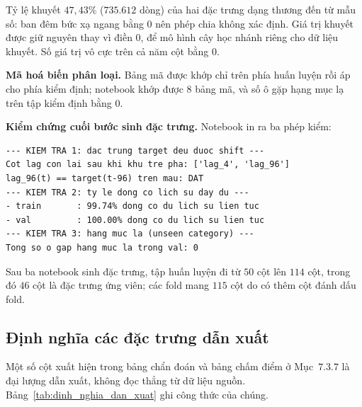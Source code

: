 \documentclass[12pt, a4paper]{report}
\begin{document}
Tỷ lệ khuyết $47{,}43\%$ ($735.612$ dòng) của hai đặc trưng dạng thương đến từ mẫu số: ban
đêm bức xạ ngang bằng $0$ nên phép chia không xác định. Giá trị khuyết được giữ nguyên thay
vì điền $0$, để mô hình cây học nhánh riêng cho dữ liệu khuyết. Số giá trị vô cực trên cả
năm cột bằng $0$.

\textbf{Mã hoá biến phân loại.} Bảng mã được khớp chỉ trên phía huấn luyện rồi áp
cho phía kiểm định; notebook khớp được $8$ bảng mã, và số ô gặp hạng mục lạ trên tập kiểm
định bằng $0$.

\textbf{Kiểm chứng cuối bước sinh đặc trưng.} Notebook in ra ba phép kiểm:

\begingroup
\par{}\vspace{8pt}
\small\renewcommand{\baselinestretch}{1.0}\selectfont
\begin{verbatim}
--- KIEM TRA 1: dac trung target deu duoc shift ---
Cot lag con lai sau khi khu tre pha: ['lag_4', 'lag_96']
lag_96(t) == target(t-96) tren mau: DAT
--- KIEM TRA 2: ty le dong co lich su day du ---
- train       : 99.74% dong co du lich su lien tuc
- val         : 100.00% dong co du lich su lien tuc
--- KIEM TRA 3: hang muc la (unseen category) ---
Tong so o gap hang muc la trong val: 0
\end{verbatim}
\par\vspace{8pt}
\endgroup
Sau ba notebook sinh đặc trưng, tập huấn luyện đi từ $50$ cột lên $114$ cột, trong đó $46$
cột là đặc trưng ứng viên; các fold mang $115$ cột do có thêm cột đánh dấu fold.

\FloatBarrier
\subsection{Định nghĩa các đặc trưng dẫn xuất}

Một số cột xuất hiện trong bảng chẩn đoán và bảng chấm điểm ở Mục~$7.3.7$ là đại lượng dẫn xuất,
không đọc thẳng từ dữ liệu nguồn. Bảng~\ref{tab:dinh_nghia_dan_xuat} ghi công thức của chúng.
\end{document}
